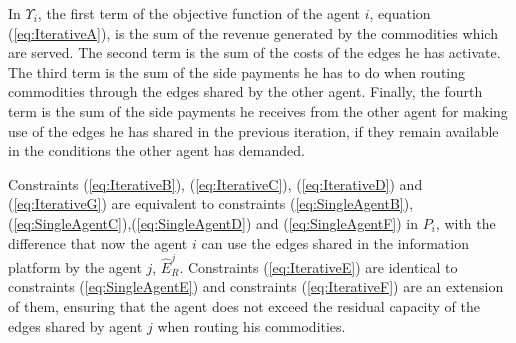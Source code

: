 \documentclass{article}
\begin{document}
In $\Upsilon_i$, the first term of the objective function of the agent $i$, equation (\ref{eq:IterativeA}), is the sum of the revenue generated by the commodities which are served. The second term is the sum of the costs of the edges he has activate. The third term is the sum of the side payments he has to do when routing commodities through the edges shared by the other agent. Finally, the fourth term is the sum of the side payments he receives from the other agent for making use of the edges he has shared in the previous iteration, if they remain available in the conditions the other agent has demanded.

Constraints (\ref{eq:IterativeB}), (\ref{eq:IterativeC}), (\ref{eq:IterativeD}) and (\ref{eq:IterativeG}) are equivalent to constraints (\ref{eq:SingleAgentB}),(\ref{eq:SingleAgentC}),(\ref{eq:SingleAgentD}) and (\ref{eq:SingleAgentF}) in $P_i$, with the difference that now the agent $i$ can use the edges shared in the information platform by the agent $j$, $\widehat{E}_R^j$. Constraints (\ref{eq:IterativeE}) are identical to constraints (\ref{eq:SingleAgentE}) and constraints (\ref{eq:IterativeF}) are an extension of them, ensuring that the agent does not exceed the residual capacity of the edges shared by agent $j$ when routing his commodities.
\end{document}
